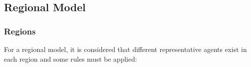 \documentclass[
thesis.tex
]{subfiles}
\begin{document}
\newpage
	
\subsection{Regional Model}\label{sec:regional-model}

%

\subsubsection*{Regions}\label{sec:regions}

For a regional model, it is considered that different representative agents exist in each region and some rules must be applied:
\end{document}
